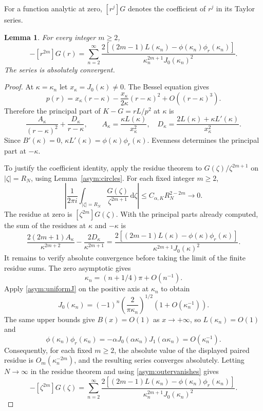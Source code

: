 \documentclass[11pt]{article}
\newtheorem{lemma}[theorem]{Lemma}
\theoremstyle{remark}
\newcommand{\dd}{\,\mathrm d}
\begin{document}
For a function analytic at zero, $[r^j]G$ denotes the coefficient of $r^j$ in its Taylor series.
\begin{lemma}
For every integer $m\ge2$,
\begin{equation}\label{gm:resformula}
 -[r^{2m}]G(r)=\sum_{n=2}^{\infty}
 \frac{2[(2m-1)L(\kappa_n)-\phi(\kappa_n)\phi_r(\kappa_n)]}
 {\kappa_n^{2m+1}J_0(\kappa_n)^2}.
\end{equation}
The series is absolutely convergent.
\end{lemma}
\begin{proof}
At $\kappa=\kappa_n$ let $x_\kappa=J_0(\kappa)\ne0$.
The Bessel equation gives
\[
 p(r)=x_\kappa(r-\kappa)
       -\frac{x_\kappa}{2\kappa}(r-\kappa)^2
       +O((r-\kappa)^3).
\]
Therefore the principal part of $K-G=rL/p^2$ at $\kappa$ is
\[
 \frac{A_\kappa}{(r-\kappa)^2}
    +\frac{D_\kappa}{r-\kappa},\qquad
 A_\kappa=\frac{\kappa L(\kappa)}{x_\kappa^2},\quad
 D_\kappa=\frac{2L(\kappa)+\kappa L'(\kappa)}{x_\kappa^2}.
\]
Since $B'(\kappa)=0$,
$\kappa L'(\kappa)=\phi(\kappa)\phi_r(\kappa)$.
Evenness determines the principal part at $-\kappa$.

To justify the coefficient identity, apply the residue theorem to
$G(\zeta)/\zeta^{2m+1}$ on $|\zeta|=R_N$, using Lemma~\ref{asym:circles}.
For each fixed integer $m\ge2$,
\begin{equation}\label{asym:outervanishes}
 \left|\frac1{2\pi i}\int_{|\zeta|=R_N}\frac{G(\zeta)}{\zeta^{2m+1}}\dd\zeta\right|
       \le C_{\alpha,K}R_N^{2-2m}\longrightarrow0.
\end{equation}
The residue at zero is $[\zeta^{2m}]G(\zeta)$. With the principal parts already
computed, the sum of the residues at $\kappa$ and $-\kappa$ is
\[
 \frac{2(2m+1)A_\kappa}{\kappa^{2m+2}}
       -\frac{2D_\kappa}{\kappa^{2m+1}}
 =\frac{2[(2m-1)L(\kappa)-\phi(\kappa)\phi_r(\kappa)]}
        {\kappa^{2m+1}J_0(\kappa)^2}.
\]
It remains to verify absolute convergence before taking the limit of
the finite residue sums. The zero asymptotic
\cite[Eq.~10.21.19]{DLMF}
gives
\[
 \kappa_n=(n+1/4)\pi+O(n^{-1}).
\]
Apply \eqref{asym:uniformJ} on the positive axis at $\kappa_n$ to obtain
\[
 J_0(\kappa_n)=(-1)^n\left(\frac{2}{\pi\kappa_n}\right)^{1/2}
                         (1+O(\kappa_n^{-1})).
\]
The same upper bounds give $B(x)=O(1)$ as $x\to+\infty$, so
$L(\kappa_n)=O(1)$ and
\[
 \phi(\kappa_n)\phi_r(\kappa_n)
   =-\alpha J_0(\alpha\kappa_n)J_1(\alpha\kappa_n)
   =O(\kappa_n^{-1}).
\]
Consequently, for each fixed $m\ge2$, the absolute value of the
displayed paired residue is $O_m(\kappa_n^{-2m})$, and the resulting
series converges absolutely. Letting $N\to\infty$ in the residue
theorem and using \eqref{asym:outervanishes} gives
\[
 -[\zeta^{2m}]G(\zeta)=\sum_{n=2}^{\infty}
 \frac{2[(2m-1)L(\kappa_n)-\phi(\kappa_n)\phi_r(\kappa_n)]}
        {\kappa_n^{2m+1}J_0(\kappa_n)^2}.
\]

\end{proof}
\end{document}
